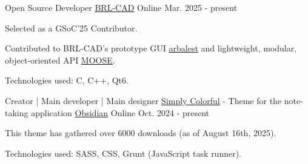



\begin{cventries}
  \cventry
    {Open Source Developer} %
    {\underline{\href{https://github.com/BRL-CAD/brlcad}{BRL-CAD}}} %
    {Online} %
    {Mar. 2025 - present} %
    {
      \begin{cvitems} %
        \item {Selected as a GSoC'25 Contributor.}
        \item {Contributed to BRL-CAD's prototype GUI \underline{\href{https://github.com/BRL-CAD/arbalest}{arbalest}} and lightweight, modular, object‑oriented API \underline{\href{https://github.com/BRL-CAD/MOOSE}{MOOSE}}.}
        \item {Technologies used: C, C++, Qt6.}
      \end{cvitems}
    }

\end{cventries}




\begin{cventries}
  \cventry
    {Creator | Main developer | Main designer} %
    {\underline{\href{https://github.com/LorenzoPegorari/SimplyColorful}{Simply Colorful}} - Theme for the note-taking application \underline{\href{https://obsidian.md}{Obsidian}}} %
    {Online} %
    {Oct. 2024 - present} %
    {
      \begin{cvitems} %
        \item {This theme has gathered over 6000 downloads (as of August 16th, 2025).}
        \item {Technologies used: SASS, CSS, Grunt (JavaScript task runner).}
      \end{cvitems}
    }

\end{cventries}
